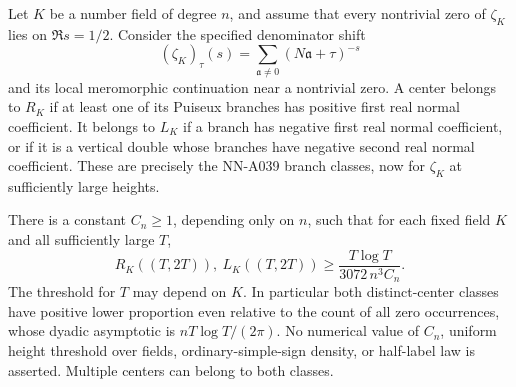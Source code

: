 \begin{theorem}
\label{thm:A043-density}
Let $K$ be a number field of degree $n$, and assume that every
nontrivial zero of $\zeta_K$ lies on $\Re s=1/2$.
Consider the specified denominator shift
\[
 (\zeta_K)_\tau(s)=\sum_{\mathfrak a\ne0}
                      (N\mathfrak a+\tau)^{-s}
\]
and its local meromorphic continuation near a nontrivial zero.
A center belongs to $R_K$ if at least one of its Puiseux
branches has positive first real normal coefficient. It belongs
to $L_K$ if a branch has negative first real normal coefficient,
or if it is a vertical double whose branches have negative
second real normal coefficient. These are precisely the
NN-A039 branch classes, now for $\zeta_K$ at sufficiently
large heights.

There is a constant $C_n\ge1$, depending only on $n$, such that
for each fixed field $K$ and all sufficiently large $T$,
\begin{equation}\label{eq:A043-counts}
 R_K((T,2T)),\ L_K((T,2T))
       \ge\frac{T\log T}{3072\,n^3 C_n}.
\end{equation}
The threshold for $T$ may depend on $K$.
In particular both distinct-center classes have positive lower
proportion even relative to the count of all zero occurrences,
whose dyadic asymptotic is $nT\log T/(2\pi)$.
No numerical value of $C_n$, uniform height threshold over
fields, ordinary-simple-sign density, or half-label law is
asserted. Multiple centers can belong to both classes.
\end{theorem}

